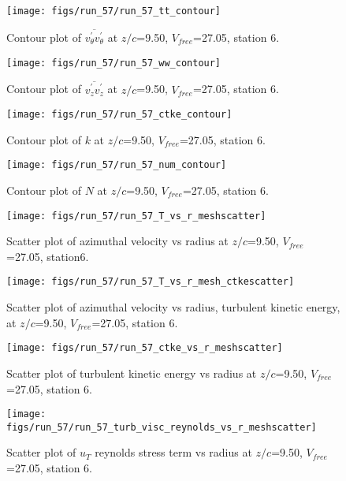 \begin{figure}[H]
\centering
\texttt{[image: figs/run\_57/run\_57\_tt\_contour]}
\caption{Contour plot of $\overline{v_{\theta}^{\prime} v_{\theta}^{\prime}}$ at $z/c$=9.50, $V_{free}$=27.05, station 6.}
\end{figure}


\begin{figure}[H]
\centering
\texttt{[image: figs/run\_57/run\_57\_ww\_contour]}
\caption{Contour plot of $\overline{v_{z}^{\prime} v_{z}^{\prime}}$ at $z/c$=9.50, $V_{free}$=27.05, station 6.}
\end{figure}


\begin{figure}[H]
\centering
\texttt{[image: figs/run\_57/run\_57\_ctke\_contour]}
\caption{Contour plot of $k$ at $z/c$=9.50, $V_{free}$=27.05, station 6.}
\end{figure}


\begin{figure}[H]
\centering
\texttt{[image: figs/run\_57/run\_57\_num\_contour]}
\caption{Contour plot of $N$ at $z/c$=9.50, $V_{free}$=27.05, station 6.}
\end{figure}


\begin{figure}[H]
\centering
\texttt{[image: figs/run\_57/run\_57\_T\_vs\_r\_meshscatter]}
\caption{Scatter plot of azimuthal velocity vs radius at $z/c$=9.50, $V_{free}$=27.05, station6.}
\end{figure}


\begin{figure}[H]
\centering
\texttt{[image: figs/run\_57/run\_57\_T\_vs\_r\_mesh\_ctkescatter]}
\caption{Scatter plot of azimuthal velocity vs radius, turbulent kinetic energy, at $z/c$=9.50, $V_{free}$=27.05, station 6.}
\end{figure}


\begin{figure}[H]
\centering
\texttt{[image: figs/run\_57/run\_57\_ctke\_vs\_r\_meshscatter]}
\caption{Scatter plot of turbulent kinetic energy vs radius at $z/c$=9.50, $V_{free}$=27.05, station 6.}
\end{figure}


\begin{figure}[H]
\centering
\texttt{[image: figs/run\_57/run\_57\_turb\_visc\_reynolds\_vs\_r\_meshscatter]}
\caption{Scatter plot of $
u_T$ reynolds stress term vs radius at $z/c$=9.50, $V_{free}$=27.05, station 6.}
\end{figure}


